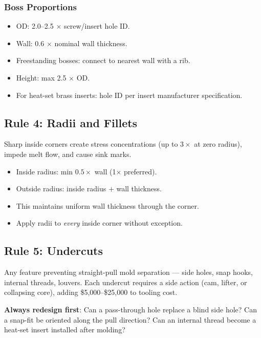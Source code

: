 \documentclass[11pt,letterpaper,twoside,openany]{book}
\begin{document}
\subsubsection{Boss Proportions}
\begin{itemize}[nosep,leftmargin=1.5em]
  \item OD: 2.0--2.5 $\times$ screw/insert hole ID.
  \item Wall: 0.6 $\times$ nominal wall thickness.
  \item Freestanding bosses: connect to nearest wall with a rib.
  \item Height: max 2.5 $\times$ OD.
  \item For heat-set brass inserts: hole ID per insert manufacturer specification.
\end{itemize}

\subsection{Rule 4: Radii and Fillets}

Sharp inside corners create stress concentrations (up to $3\times$ at zero radius), impede melt flow, and cause sink marks.

\begin{itemize}[nosep,leftmargin=1.5em]
  \item Inside radius: min $0.5\times$ wall (1$\times$ preferred).
  \item Outside radius: inside radius $+$ wall thickness.
  \item This maintains uniform wall thickness through the corner.
  \item Apply radii to \emph{every} inside corner without exception.
\end{itemize}

\subsection{Rule 5: Undercuts}

Any feature preventing straight-pull mold separation --- side holes, snap hooks, internal threads, louvers. Each undercut requires a side action (cam, lifter, or collapsing core), adding \$5,000--\$25,000 to tooling cost.

\textbf{Always redesign first}: Can a pass-through hole replace a blind side hole? Can a snap-fit be oriented along the pull direction? Can an internal thread become a heat-set insert installed after molding?
\end{document}
